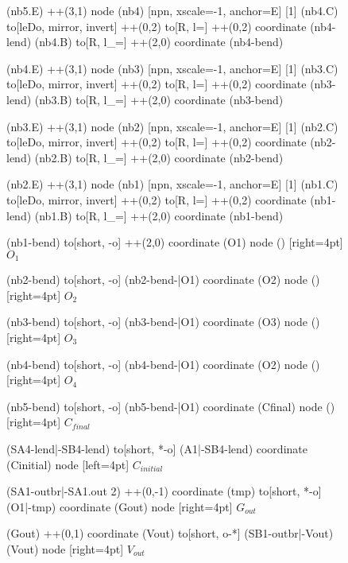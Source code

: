 \documentclass[a4paper, 10pt]{article}
\begin{document}
\begin{figure}[!h]
{\begin{circuitikz}[american, rotate=-90, transform shape]
			(nb5.E) ++(3,1)
			node (nb4) [npn, xscale=-1, anchor=E] {
				\scalebox{-1}[1]{\gateTransistor}}
			(nb4.C)
			to[leDo, mirror, invert] ++(0,2)
			to[R, l=\ledResistor] ++(0,2)
			coordinate (nb4-lend)
			(nb4.B)
			to[R, l_=\baseResistor] ++(2,0)
			coordinate (nb4-bend)

			(nb4.E) ++(3,1)
			node (nb3) [npn, xscale=-1, anchor=E] {
				\scalebox{-1}[1]{\gateTransistor}}
			(nb3.C)
			to[leDo, mirror, invert] ++(0,2)
			to[R, l=\ledResistor] ++(0,2)
			coordinate (nb3-lend)
			(nb3.B)
			to[R, l_=\baseResistor] ++(2,0)
			coordinate (nb3-bend)

			(nb3.E) ++(3,1)
			node (nb2) [npn, xscale=-1, anchor=E] {
				\scalebox{-1}[1]{\gateTransistor}}
			(nb2.C)
			to[leDo, mirror, invert] ++(0,2)
			to[R, l=\ledResistor] ++(0,2)
			coordinate (nb2-lend)
			(nb2.B)
			to[R, l_=\baseResistor] ++(2,0)
			coordinate (nb2-bend)

			(nb2.E) ++(3,1)
			node (nb1) [npn, xscale=-1, anchor=E] {
				\scalebox{-1}[1]{\gateTransistor}}
			(nb1.C)
			to[leDo, mirror, invert] ++(0,2)
			to[R, l=\ledResistor] ++(0,2)
			coordinate (nb1-lend)
			(nb1.B)
			to[R, l_=\baseResistor] ++(2,0)
			coordinate (nb1-bend)


			(nb1-bend)
			to[short, -o] ++(2,0)
			coordinate (O1)
			node () [right=4pt] {$O_{1}$}

			(nb2-bend)
			to[short, -o] (nb2-bend-|O1)
			coordinate (O2)
			node () [right=4pt] {$O_{2}$}

			(nb3-bend)
			to[short, -o] (nb3-bend-|O1)
			coordinate (O3)
			node () [right=4pt] {$O_{3}$}

			(nb4-bend)
			to[short, -o] (nb4-bend-|O1)
			coordinate (O2)
			node () [right=4pt] {$O_{4}$}

			(nb5-bend)
			to[short, -o] (nb5-bend-|O1)
			coordinate (Cfinal)
			node () [right=4pt] {$C_{final}$}


			(SA4-lend|-SB4-lend)
			to[short, *-o] (A1|-SB4-lend)
			coordinate (Cinitial)
			node [left=4pt] {$C_{initial}$}


			(SA1-outbr|-SA1.out 2) ++(0,-1)
			coordinate (tmp)
			to[short, *-o] (O1|-tmp)
			coordinate (Gout)
			node [right=4pt] {$G_{out}$}

			(Gout) ++(0,1)
			coordinate (Vout)
			to[short, o-*] (SB1-outbr|-Vout)
			(Vout)
			node [right=4pt] {$V_{out}$}


\end{circuitikz}}
\end{figure}
\end{document}
